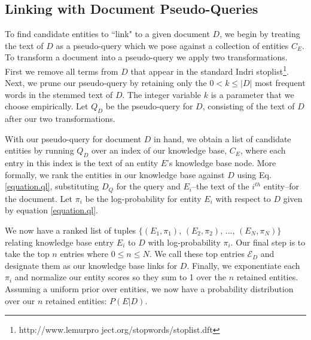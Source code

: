\documentclass{sig-alternate}
\newcommand\rankeq{\mathrel{\overset{\makebox[0pt]{\mbox{\normalfont\tiny\sffamily rank}}}{=}}}
\begin{document}
\subsection{Linking with Document Pseudo-Queries}\label{section.linking.queries}
%
%
\noindent To find candidate entities to ``link" to a given document $D$, we begin by treating the text of $D$ as a pseudo-query which we pose against a collection of entities $C_E$.  To transform a document into a pseudo-query we apply two transformations.  First we remove all terms from $D$ that appear in the standard Indri stoplist\footnote{http://www.lemurpro ject.org/stopwords/stoplist.dft}.  Next, we prune our pseudo-query by retaining only the $0 < k \leq |D|$ most frequent words in the stemmed text of $D$.  The integer variable $k$ is a parameter that we choose empirically.  Let $Q_D$ be the pseudo-query for $D$, consisting of the text of $D$ after our two transformations.

With our pseudo-query for document $D$ in hand, we obtain a list of candidate entities by running $Q_D$ over an index of our knowledge base, $C_E$, where each entry in this index is the text of an entity $E$'s knowledge base node. More formally, we rank the entities in our knowledge base against $D$ using Eq. \ref{equation.ql}, substituting $D_Q$ for the query and $E_i$--the text of the $i^{th}$ entity--for the document. Let $\pi_i$ be the log-probability for entity $E_i$ with respect to $D$ given by equation \ref{equation.ql}.  

We now have a ranked list of tuples $\{(E_1, \pi_1)$, $(E_2, \pi_2)$, $...$, $(E_N, \pi_N)\}$ relating knowledge base entry $E_i$ to $D$ with log-probability $\pi_i$. Our final step is to take the top $n$ entries where $0 \leq n \leq N$. We call these top entries $\mathcal{E}_D$ and designate them as our knowledge base links for $D$.  Finally, we exponentiate each $\pi_i$ and normalize our entity scores so they sum to 1 over the $n$ retained entities.  Assuming a uniform prior over entities, we now have a probability distribution over our $n$ retained entities: $P(E | D)$.
\end{document}
